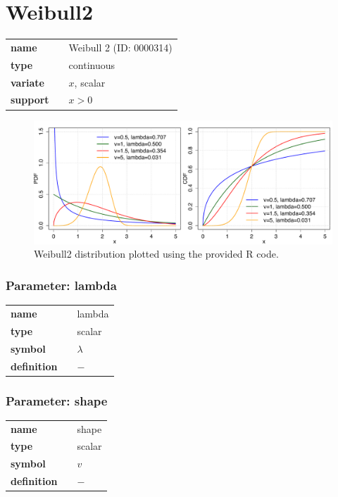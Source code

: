 \section*{Weibull2} 

  \bigskip 

\begin{tabular}{p{2cm}cl}
\textbf{name} & & Weibull 2 (ID: 0000314)\\ 
 
\textbf{type} & & continuous \\ 

\textbf{variate} & & $x$, scalar \\ 

\textbf{support} & & $x > 0$
\end{tabular}

\begin{figure}[ht!]
\centering
  \includegraphics[width=140mm]{pics/Weibull2.pdf}
 \caption{Weibull2 distribution plotted using the provided R code.}
 \label{fig:Weibull2}
\end{figure}

\subsubsection*{Parameter: lambda}

\noindent\begin{tabular}{p{2cm}cl}
\textbf{name} & & lambda \\
\textbf{type} & & scalar \\
\textbf{symbol} & & $\lambda$  \\
\textbf{definition} & & $-$
\end{tabular}
\subsubsection*{Parameter: shape}

\noindent\begin{tabular}{p{2cm}cl}
\textbf{name} & & shape \\
\textbf{type} & & scalar \\
\textbf{symbol} & & $v$  \\
\textbf{definition} & & $-$
\end{tabular}
